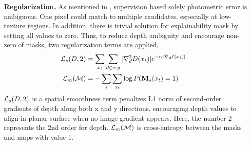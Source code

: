 

\textbf{Regularization.} 
As mentioned in , supervision based solely photometric error is ambiguous. One pixel could match to multiple candidates, especially at low-texture regions. In addition, there is trivial solution for explainability mask by setting all values to zero. Thus, to reduce depth ambiguity and encourage non-zero of masks, two regularization terms are applied, 
\begin{align}
\label{eqn:regular}
{\mathcal L}_{s}(D, 2) &= \sum_{x_t}\sum_{d \in {x, y}}|\nabla^{2}_dD(x_t)|e^{-\alpha|\nabla_dI(x_t)|} & \nonumber \\
{\mathcal L}_{m}({\mathcal M}) &= -\sum_s\sum_{x_t}\log P({\mathbf M_s}(x_t) = 1) &
\end{align}
${\mathcal L}_{s}(D, 2)$ is a spatial smoothness term penalizes L1 norm of second-order gradients of depth along both x and y directions, encouraging depth values to align in planar surface when no image gradient appears. Here, the number $2$ represents the 2nd order for depth. ${\mathcal L}_{m}({\mathcal M})$ is cross-entropy between the masks and maps with value 1.

